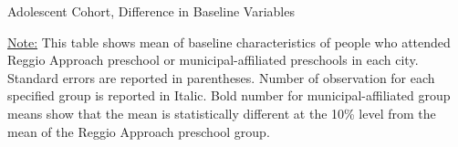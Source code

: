 \begin{table}[H] \caption{Adolescent Cohort, Difference in Baseline Variables} \label{apptab:munivsaffi-adol}
	\scalebox{0.8}{
	}
	\footnotesize\raggedright{\underline{Note:} This table shows mean of baseline characteristics of people who attended Reggio Approach preschool or municipal-affiliated preschools in each city. Standard errors are reported in parentheses. Number of observation for each specified group is reported in Italic. Bold number for municipal-affiliated group means show that the mean is statistically different at the 10\% level from the mean of the Reggio Approach preschool group.}
\end{table}

